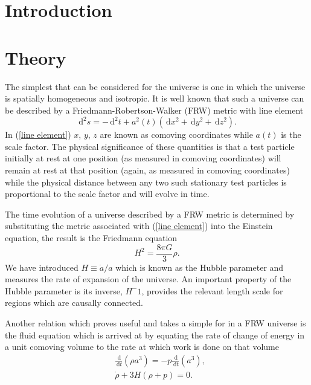 \documentclass[letterpaper,11pt]{article}
\newcommand{\ud}{\,\mathrm{d}}
\begin{document}
\begin{abstract}
\end{abstract}
\section{Introduction}
\section{Theory}
The simplest that can be considered for the universe is one in which the universe is spatially homogeneous and isotropic. It is well known that such a universe can be described by a Friedmann-Robertson-Walker (FRW) metric with line element
\begin{equation}
\ud^2s=-\ud^2t+a^2(t)(\ud x^2+\ud y^2+\ud z^2). \label{line element}
\end{equation}
In (\ref{line element}) $x$, $y$, $z$ are known as comoving coordinates while $a(t)$ is the scale factor. The physical significance of these quantities is that a test particle initially at rest at one position (as measured in comoving coordinates) will remain at rest at that position (again, as measured in comoving coordinates) while the physical distance between any two such stationary test particles is proportional to the scale factor and will evolve in time.

The time evolution of a universe described by a FRW metric is determined by substituting the metric associated with (\ref{line element}) into the Einstein equation, the result is the Friedmann equation
\begin{equation}
H^2=\frac{8\pi G}{3}\rho. \label{fried eqn}
\end{equation}
We have introduced $H\equiv \dot{a}/a$ which is known as the Hubble parameter and measures the rate of expansion of the universe. An important property of the Hubble parameter is its inverse, $H^-1$, provides the relevant length scale for regions which are causally connected.%

Another relation which proves useful and takes a simple for in a FRW universe is the fluid equation which is arrived at by equating the rate of change of energy in a unit comoving volume to the rate at which work is done on that volume
\begin{align}
&\frac{\ud}{\ud t}(\rho a^3)=-p\frac{\ud}{\ud t}(a^3),\\
&\dot{\rho}+3H(\rho +p)=0. \label{fluid eqn}
\end{align}
\end{document}
